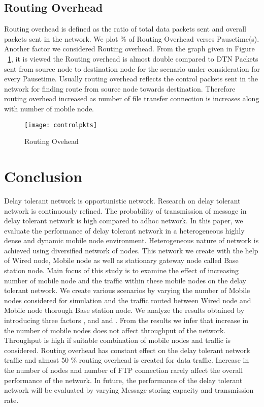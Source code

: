 \documentclass[3p,times]{elsarticle}
\begin{document}
\subsection{Routing Overhead}
Routing overhead is defined as the ratio of total data packets sent and overall packets sent in the network. We plot \% of Routing Overhead verses Pausetime(s).
Another factor we considered Routing overhead. From the graph given in Figure ~\ref{g4}, it is viewed the Routing overhead is almost double compared to DTN Packets sent from source node to destination node for the scenario under consideration for every Pausetime. Usually routing overhead reflects the control packets sent in the network for finding route from source node towards destination. Therefore routing overhead increased as number of file transfer connection is increases along with number of mobile node. 
\begin{figure}[t]
\centering
\mbox{\texttt{[image: controlpkts]}}
\caption{Routing Ovehead}
\label{g4}
\end{figure}

\section{Conclusion}\label{conl}
Delay tolerant network is opportunistic network. Research on delay tolerant network is continuously refined. The probability of transmission of message in delay tolerant network is high compared to adhoc network. In this paper, we evaluate the performance of delay tolerant network in a heterogeneous highly dense and dynamic mobile node environment. Heterogeneous nature of network is achieved using diversified network of nodes. This network we create with the help of Wired node, Mobile node as well as stationary gateway node called Base station node. Main focus of this study is to examine the effect of increasing number of mobile node and the traffic within these mobile nodes on the delay tolerant network. We create various scenarios by varying the number of Mobile nodes considered for simulation and the traffic routed between Wired node and Mobile node thorough Base station node. We analyze the results obtained by introducing three factors ,  and  and . From the results we infer that increase in the number of mobile nodes does not affect throughput of the network. Throughput is high if suitable combination of mobile nodes and traffic is considered. Routing overhead has constant effect on the delay tolerant network traffic and almost 50 \% routing overhead is created for data traffic. Increase in the number of nodes and number of FTP connection rarely affect the overall performance of the network. In future, the performance of the delay tolerant network will be evaluated by varying Message storing capacity and transmission rate.  
\end{document}
